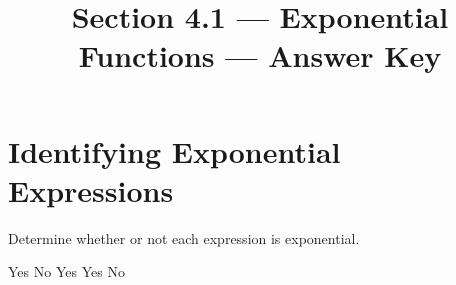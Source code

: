 

\title{Section 4.1 --- Exponential Functions --- Answer Key}

\NewDocumentCommand{\DomRng}{m d(] d[)}{%
$\dom #1=\eint$\\$\rng #1=%
\IfNoValueTF{#2}{%
\IfNoValueTF{#3}{%
\eint
}{
\lint{#3}
}}{
\rint{#2}
}$}


\maketitle

\section*{Identifying Exponential Expressions}
Determine whether or not each expression is exponential.
\begin{smenum}
\mitemxxxxx
{Yes}
{No}
{Yes}
{Yes}
{No}
\end{smenum}

